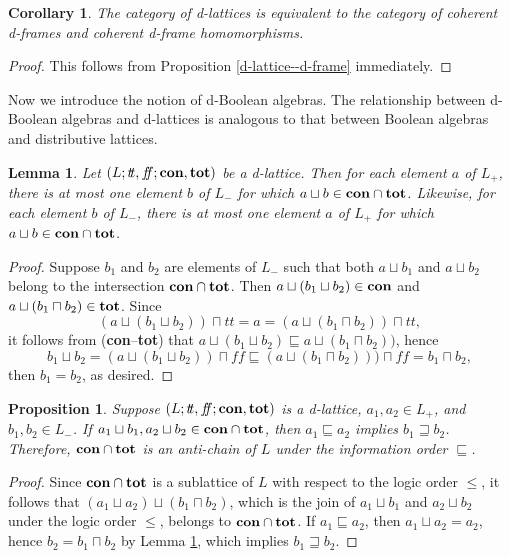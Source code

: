 \documentclass[11pt]{article}
\theoremstyle{plain}
\newtheorem{lem}[thm]{Lemma}
\newtheorem{prop}[thm]{Proposition}
\newtheorem{cor}[thm]{Corollary}
\theoremstyle{definition}
\newcommand{\dbt}{{t\!t}}
\newcommand{\dbf}{{f\!\!f}}
\begin{document}
\begin{cor}\label{d-lattice vs d-frame} The category of d-lattices is equivalent to the category of  coherent d-frames and coherent d-frame homomorphisms. \end{cor}
\begin{proof} This follows from Proposition \ref{d-lattice--d-frame} immediately. \end{proof}

Now we introduce the notion of d-Boolean algebras. The relationship between d-Boolean algebras and  d-lattices is analogous to that between Boolean algebras and distributive lattices.

\begin{lem}\label{uniqueness of adag} Let $(L;\dbt,\dbf;{\bf con},{\bf tot})$ be a d-lattice. Then for each element $a$ of $L_+$, there is at most one element $b$ of $L_-$ for which $a\sqcup b\in {\bf con}\cap {\bf tot}$. Likewise, for each element $b$ of $L_-$, there is at most one element $a$ of $L_+$ for which $a\sqcup b\in {\bf con}\cap {\bf tot}$.   \end{lem} 

\begin{proof} Suppose   $b_1$ and $b_2$ are elements of $L_-$ such that both $a\sqcup b_1$ and $a\sqcup b_2$ belong to the intersection ${\bf con}\cap {\bf tot}$. Then $a\sqcup(b_1\sqcup b_2)\in{\bf con}$ and  $a\sqcup (b_1\sqcap b_2)\in{\bf tot}$. Since $$(a\sqcup(b_1\sqcup b_2))\sqcap \dbt=a=(a\sqcup (b_1\sqcap b_2))\sqcap  \dbt , $$ it follows from  ({\bf con}--{\bf tot}) that $a\sqcup(b_1\sqcup b_2)\sqsubseteq a\sqcup (b_1\sqcap b_2))$, hence  $$b_1\sqcup b_2= (a\sqcup(b_1\sqcup b_2))\sqcap\dbf\sqsubseteq (a\sqcup (b_1\sqcap b_2)))\sqcap\dbf = b_1\sqcap b_2,$$  then $b_1=b_2$, as desired. \end{proof}
 

\begin{prop}\label{d-complement is order-reversing} Suppose $(L;\dbt,\dbf;{\bf con},{\bf tot})$ is a d-lattice, $a_1,a_2\in L_+$, and   $b_1,b_2\in L_-$.   If $a_1\sqcup b_1, a_2\sqcup b_2 \in{\bf con} \cap {\bf tot}$, then $a_1\sqsubseteq a_2$ implies   $b_1\sqsupseteq b_2$. Therefore, ${\bf con} \cap {\bf tot}$ is an anti-chain of $L$ under the information order $\sqsubseteq$. \end{prop}

\begin{proof} Since ${\bf con} \cap {\bf tot}$ is a sublattice of $L$ with respect to the logic order $\leq$, it follows that   $(a_1\sqcup a_2)\sqcup(b_1\sqcap b_2)$, which is the join of $a_1\sqcup b_1$ and $a_2\sqcup b_2$ under the logic order $\leq$, belongs to ${\bf con} \cap {\bf tot}$.   If $a_1\sqsubseteq a_2$, then $a_1\sqcup a_2=a_2$, hence $b_2= b_1\sqcap b_2$ by Lemma \ref{uniqueness of adag}, which implies $b_1\sqsupseteq b_2$. \end{proof}
\end{document}

